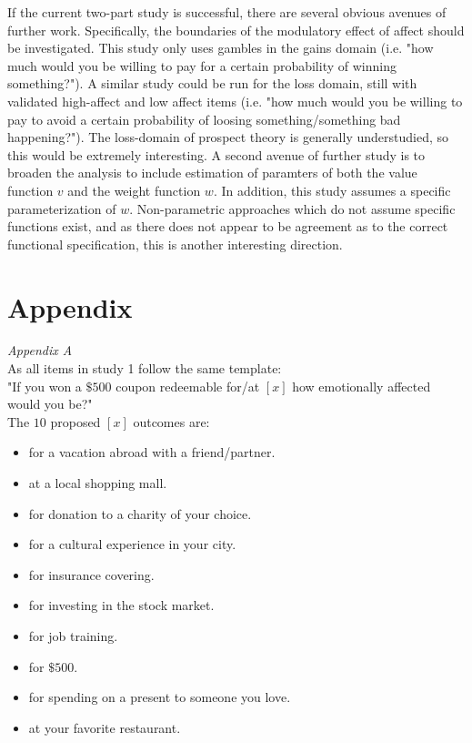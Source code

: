 \documentclass[12pt]{article}
\begin{document}
\vspace{3mm}
If the current two-part study is successful,
there are several obvious avenues of further
work. Specifically, the boundaries of the modulatory
effect of affect should be investigated. This study
only uses gambles in the gains domain (i.e. "how
much would you be willing to pay for a
certain probability of winning something?"). A similar
study could be run for the loss domain, still with
validated high-affect and low affect items (i.e. "how
much would you be willing to pay to avoid a
certain probability of loosing something/something
bad happening?").
The loss-domain of prospect theory is generally
understudied, so this would be extremely interesting.
A second avenue of further study is to broaden
the analysis to include estimation of paramters
of both the value function $v$ and the weight
function  $w$. In addition, this study assumes
a specific parameterization of $w$.
Non-parametric approaches which do not assume
specific functions exist, and as there does not
appear to be agreement as to the correct functional
specification, this is another interesting
direction.

\section{Appendix}

\emph{Appendix A} \\
As all items in study 1 follow the same template: \\

"If you won a $\$500$ coupon redeemable for/at
$[x]$ how emotionally affected would you be?" \\

The $10$ proposed $[x]$ outcomes are:
\begin{itemize}
	\item for a vacation abroad with a friend/partner.
	\item at a local shopping mall.
	\item for donation to a charity of your choice.
	\item for a cultural experience in your city.
	\item for insurance covering.
	\item for investing in the stock market.
	\item for job training.
	\item for $\$500$.
	\item for spending on a present to someone you love.
	\item at your favorite restaurant.
\end{itemize}
\end{document}
